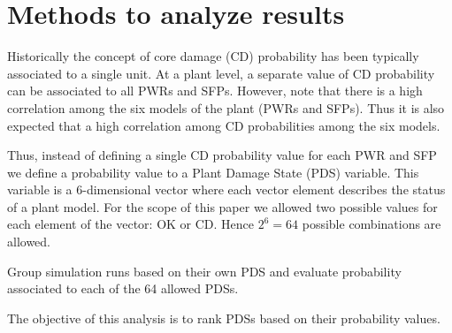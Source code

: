\section{Methods to analyze results}
\label{sec:plantAnalysisResults}

Historically the concept of core damage (CD) probability has been typically 
associated to a single unit. At a plant level, a separate value of CD 
probability can be associated to all PWRs and SFPs. However, note that there 
is a high correlation among the six models of the plant (PWRs and SFPs). 
Thus it is also expected that a high correlation among CD probabilities among 
the six models.

Thus, instead of defining a single CD probability value for each PWR and SFP 
we define a probability value to a Plant Damage State (PDS) variable. This 
variable is a $6$-dimensional vector where each vector element describes the 
status of a plant model. For the scope of this paper we allowed two possible 
values for each element of the vector: OK or CD. Hence $2^6=64$ possible 
combinations are allowed.

Group simulation runs based on their own PDS and evaluate probability associated 
to each of the 64 allowed PDSs.

The objective of this analysis is to rank PDSs based on their 
probability values.
